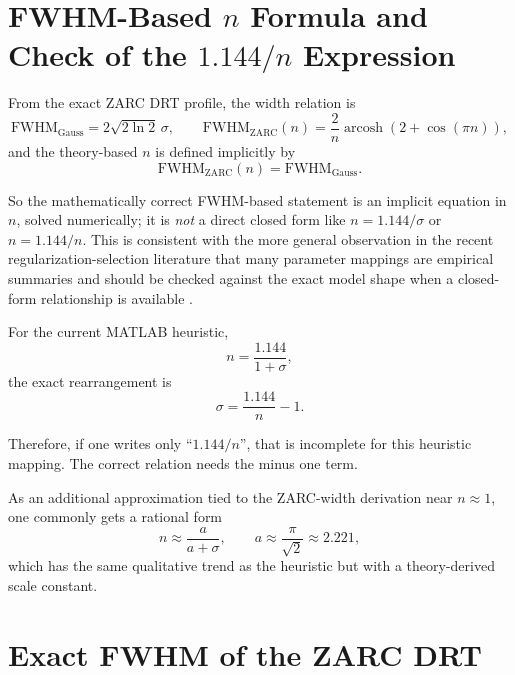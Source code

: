 \documentclass[11pt]{article}
\begin{document}
\section{FWHM-Based $n$ Formula and Check of the $1.144/n$ Expression}

From the exact ZARC DRT profile, the width relation is
\begin{equation}
\mathrm{FWHM}_{\mathrm{Gauss}} = 2\sqrt{2\ln 2}\,\sigma,
\qquad
\mathrm{FWHM}_{\mathrm{ZARC}}(n) = \frac{2}{n}\operatorname{arcosh}\left(2+\cos(\pi n)\right),
\end{equation}
and the theory-based $n$ is defined implicitly by
\begin{equation}
\mathrm{FWHM}_{\mathrm{ZARC}}(n) = \mathrm{FWHM}_{\mathrm{Gauss}}.
\end{equation}

So the mathematically correct FWHM-based statement is an implicit equation in $n$, solved numerically; it is \emph{not} a direct closed form like $n = 1.144/\sigma$ or $n = 1.144/n$. This is consistent with the more general observation in the recent regularization-selection literature that many parameter mappings are empirical summaries and should be checked against the exact model shape when a closed-form relationship is available \cite{maradesa2023,carbone2025}.

For the current MATLAB heuristic,
\begin{equation}
n = \frac{1.144}{1+\sigma},
\end{equation}
the exact rearrangement is
\begin{equation}
\sigma = \frac{1.144}{n} - 1.
\end{equation}

Therefore, if one writes only ``$1.144/n$'', that is incomplete for this heuristic mapping. The correct relation needs the minus one term.

As an additional approximation tied to the ZARC-width derivation near $n\approx 1$, one commonly gets a rational form
\begin{equation}
n \approx \frac{a}{a+\sigma},
\qquad a \approx \frac{\pi}{\sqrt{2}} \approx 2.221,
\end{equation}
which has the same qualitative trend as the heuristic but with a theory-derived scale constant.

\section{Exact FWHM of the ZARC DRT}
\end{document}
